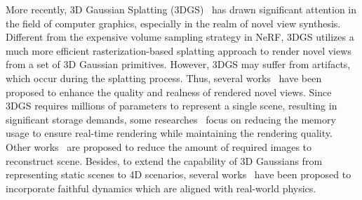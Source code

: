 More recently, 3D Gaussian Splatting (3DGS)~\cite{3DGS2023ToG} has drawn significant attention in the field of computer graphics, especially in the realm of novel view synthesis. Different from the expensive volume sampling strategy in NeRF, 3DGS utilizes a much more efficient rasterization-based splatting approach to render novel views from a set of 3D Gaussian primitives. 
However, 3DGS may suffer from artifacts, which occur during the splatting process. Thus, several works~\cite{yan2023multi, gao2023relightable, jiang2023gaussianshader, liang2023gs} have been proposed to enhance the quality and realness of rendered novel views.
Since 3DGS requires millions of parameters to represent a single scene, resulting in significant storage demands, some researches~\cite{lu2023scaffold, navaneet2023compact3d, girish2023eagles, fan2023lightgaussian, katsumata2023efficient} focus on reducing the memory usage to ensure real-time rendering while maintaining the rendering quality. Other works~\cite{zhu2023fsgs, xiong2023sparsegs} are proposed to reduce the amount of required images to reconstruct scene.
Besides, to extend the capability of 3D Gaussians from representing static scenes to 4D scenarios, several works~\cite{wu20234d,duisterhof2023md,yang2023real,xie2023physgaussian} have been proposed to incorporate faithful dynamics which are aligned with real-world physics.





